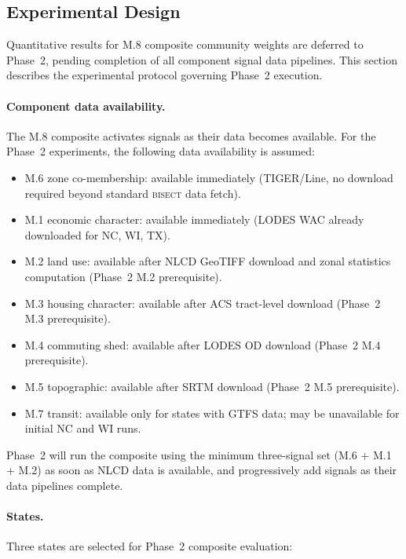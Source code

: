 \label{sec:legal}

\subsection{Experimental Design}

Quantitative results for M.8 composite community weights are deferred to
Phase~2, pending completion of all component signal data pipelines.
This section describes the experimental protocol governing Phase~2 execution.

\paragraph{Component data availability.}
The M.8 composite activates signals as their data becomes available.
For the Phase~2 experiments, the following data availability is assumed:

\begin{itemize}
  \item M.6 zone co-membership: available immediately (TIGER/Line, no download
    required beyond standard \textsc{bisect} data fetch).
  \item M.1 economic character: available immediately (LODES WAC already
    downloaded for NC, WI, TX).
  \item M.2 land use: available after NLCD GeoTIFF download and zonal statistics
    computation (Phase~2 M.2 prerequisite).
  \item M.3 housing character: available after ACS tract-level download
    (Phase~2 M.3 prerequisite).
  \item M.4 commuting shed: available after LODES OD download (Phase~2 M.4
    prerequisite).
  \item M.5 topographic: available after SRTM download (Phase~2 M.5 prerequisite).
  \item M.7 transit: available only for states with GTFS data; may be unavailable
    for initial NC and WI runs.
\end{itemize}

Phase~2 will run the composite using the minimum three-signal set (M.6 + M.1 + M.2)
as soon as NLCD data is available, and progressively add signals as their data
pipelines complete.

\paragraph{States.}
Three states are selected for Phase~2 composite evaluation:

